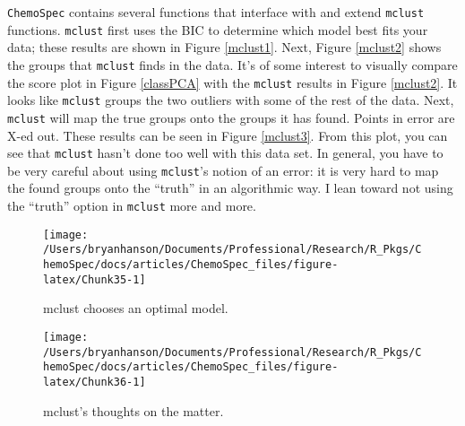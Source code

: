 \documentclass[letter,10pt,twocolumn,twoside,printwatermark=false]{pinp}
\begin{document}
\texttt{ChemoSpec} contains several functions that interface with and
extend \texttt{mclust} functions. \texttt{mclust} first uses the BIC to
determine which model best fits your data; these results are shown in
Figure \ref{mclust1}. Next, Figure \ref{mclust2} shows the groups that
\texttt{mclust} finds in the data. It's of some interest to visually
compare the score plot in Figure \ref{classPCA} with the \texttt{mclust}
results in Figure \ref{mclust2}. It looks like \texttt{mclust} groups
the two outliers with some of the rest of the data. Next,
\texttt{mclust} will map the true groups onto the groups it has found.
Points in error are X-ed out. These results can be seen in Figure
\ref{mclust3}. From this plot, you can see that \texttt{mclust} hasn't
done too well with this data set. In general, you have to be very
careful about using \texttt{mclust}'s notion of an error: it is very
hard to map the found groups onto the ``truth'' in an algorithmic way. I
lean toward not using the ``truth'' option in \texttt{mclust} more and
more.

\begin{Shaded}
\begin{Highlighting}[]
\StringTok{ }
   \NormalTok{,}
\end{Highlighting}
\end{Shaded}

\begin{figure}

{\centering \texttt{[image: /Users/bryanhanson/Documents/Professional/Research/R\_Pkgs/ChemoSpec/docs/articles/ChemoSpec\_files/figure-latex/Chunk35-1]} 

}

\caption{\label{mclust1}mclust chooses an optimal model.}\label{fig:Chunk35}
\end{figure}

\begin{Shaded}
\begin{Highlighting}[]
\StringTok{ }
   \NormalTok{,}
\end{Highlighting}
\end{Shaded}

\begin{figure}

{\centering \texttt{[image: /Users/bryanhanson/Documents/Professional/Research/R\_Pkgs/ChemoSpec/docs/articles/ChemoSpec\_files/figure-latex/Chunk36-1]} 

}

\caption{\label{mclust2}mclust's thoughts on the matter.}\label{fig:Chunk36}
\end{figure}
\end{document}
